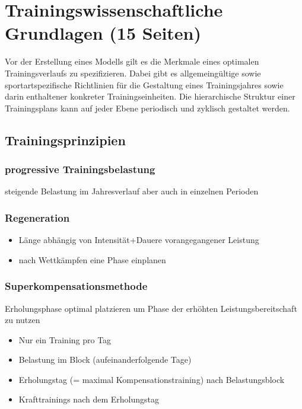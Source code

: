 \chapter{Trainingswissenschaftliche Grundlagen (15 Seiten)}
\label{sec:grundlagen}
Vor der Erstellung eines Modells gilt es die Merkmale eines optimalen Trainingsverlaufs zu spezifizieren. Dabei gibt es allgemeingültige sowie sportartspezifische Richtlinien für die Gestaltung eines Trainingsjahres sowie darin enthaltener konkreter Trainingseinheiten.
Die hierarchische Struktur einer Trainingsplans kann auf jeder Ebene periodisch und zyklisch gestaltet werden.

\section{Trainingsprinzipien}
\subsection{progressive Trainingsbelastung}
    \cite[60-61]{Radsporttraining}
    steigende Belastung im Jahresverlauf aber auch in einzelnen Perioden
\subsection{Regeneration}
    \begin{itemize}
        \item Länge abhängig von Intensität+Dauere vorangegangener Leistung
        \item nach Wettkämpfen eine Phase einplanen
    \end{itemize}

\subsection{Superkompensationsmethode}
    \cite[44-46]{Radsporttraining}
    Erholungsphase optimal platzieren um Phase der erhöhten Leistungsbereitschaft zu nutzen
    \begin{itemize}
        \item Nur ein Training pro Tag
        \item Belastung im Block (aufeinanderfolgende Tage)
        \item Erholungstag (= maximal Kompensationstraining) nach Belastungsblock
        \item Krafttrainings nach dem Erholungstag
    \end{itemize}
    
